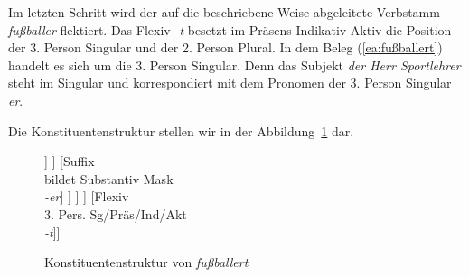 Im letzten Schritt wird der auf die beschriebene Weise abgeleitete Verbstamm \textit{fußballer} flektiert. Das Flexiv \textit{-t} besetzt im Präsens Indikativ Aktiv die Position der 3. Person Singular und der 2. Person Plural. In dem Beleg (\ref{ea:fußballert}) handelt es sich um die 3. Person Singular. Denn das Subjekt \textit{der Herr Sportlehrer} steht im Singular und korrespondiert mit dem Pronomen der 3. Person Singular \textit{er}.

Die Konstituentenstruktur stellen wir in der Abbildung~\ref{Abb:fußballert} dar.

\begin{figure}
	\centering
	\begin{forest}
		[Bildung: Flexion\\Verb 3. Pers. Sg/Präs/Ind/Akt\\ \textit{fußballert} [Stammform\\Verb\\\textit{fußballer} [Konversion\\Nomen agentis auf \textit{-er} $\rightarrow$ Verbsuffix \textit{-er} [Stammform \\ Substantiv Mask\\ \textit{Fußballer} [Derivationsstammform \\ Substantiv Mask \\ \textit{fußball} [Stammform \\ Substantiv Mask \\\textit{Fußball} [Kompositionsstammform \\ Substantiv Mask \\\textit{fuß}] [Stammform \\ Substantiv Mask \\ \textit{Ball}] ] ] [Suffix \\ bildet Substantiv Mask \\\textit{-er}] ] ] ] [Flexiv\\3. Pers. Sg/Präs/Ind/Akt\\\textit{-t}]]
	\end{forest}
	\caption{Konstituentenstruktur von \textit{fußballert}}\label{Abb:fußballert}
\end{figure}

